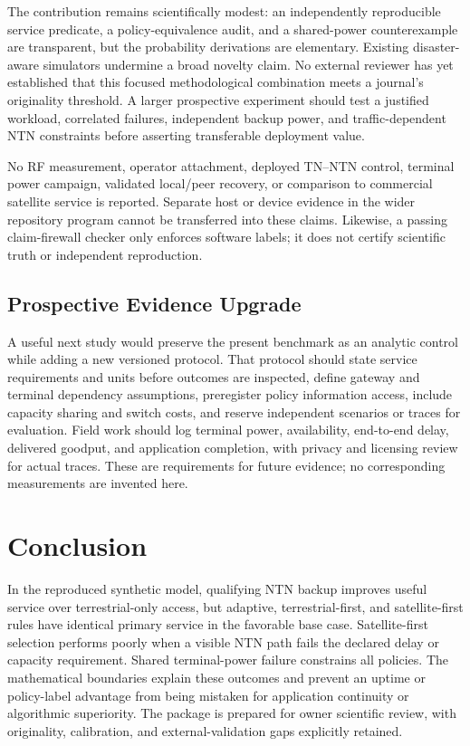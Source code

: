 \documentclass{IEEEoj}
\begin{document}
The contribution remains scientifically modest: an independently reproducible service predicate, a policy-equivalence audit, and a shared-power counterexample are transparent, but the probability derivations are elementary. Existing disaster-aware simulators undermine a broad novelty claim. No external reviewer has yet established that this focused methodological combination meets a journal's originality threshold. A larger prospective experiment should test a justified workload, correlated failures, independent backup power, and traffic-dependent NTN constraints before asserting transferable deployment value.

No RF measurement, operator attachment, deployed TN--NTN control, terminal power campaign, validated local/peer recovery, or comparison to commercial satellite service is reported. Separate host or device evidence in the wider repository program cannot be transferred into these claims. Likewise, a passing claim-firewall checker only enforces software labels; it does not certify scientific truth or independent reproduction.

\subsection{Prospective Evidence Upgrade}
A useful next study would preserve the present benchmark as an analytic control while adding a new versioned protocol. That protocol should state service requirements and units before outcomes are inspected, define gateway and terminal dependency assumptions, preregister policy information access, include capacity sharing and switch costs, and reserve independent scenarios or traces for evaluation. Field work should log terminal power, availability, end-to-end delay, delivered goodput, and application completion, with privacy and licensing review for actual traces. These are requirements for future evidence; no corresponding measurements are invented here.

\section{Conclusion}
In the reproduced synthetic model, qualifying NTN backup improves useful service over terrestrial-only access, but adaptive, terrestrial-first, and satellite-first rules have identical primary service in the favorable base case. Satellite-first selection performs poorly when a visible NTN path fails the declared delay or capacity requirement. Shared terminal-power failure constrains all policies. The mathematical boundaries explain these outcomes and prevent an uptime or policy-label advantage from being mistaken for application continuity or algorithmic superiority. The package is prepared for owner scientific review, with originality, calibration, and external-validation gaps explicitly retained.
\end{document}
